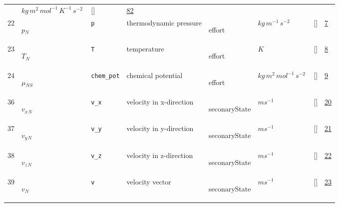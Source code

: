 \begin{longtable}{|p{1cm}|p{3cm}|p{3cm}|p{7cm}|p{3.0cm}|p{3cm}|p{2cm}|p{1cm}|}
             & $ kg \,m^{2} \,mol^{-1} \,K^{-1} \,s^{-2} \, $
             & []
             & \hyperlink{"e:82"}{ 82 }
                 \\
    22
             & \hypertarget{"v:22"}{ $ {p}{_{N}} $}
             & \verb|p|
             & thermodynamic pressure
             & \begin{lay}effort \end{lay}
             & $ kg \,m^{-1} \,s^{-2} \, $
             & []
             & \hyperlink{"e:7"}{ 7 }
                 \\
    23
             & \hypertarget{"v:23"}{ $ {T}{_{N}} $}
             & \verb|T|
             & temperature
             & \begin{lay}effort \end{lay}
             & $ K \, $
             & []
             & \hyperlink{"e:8"}{ 8 }
                 \\
    24
             & \hypertarget{"v:24"}{ $ {\mu}{_{{N S}}} $}
             & \verb|chem_pot|
             & chemical potential
             & \begin{lay}effort \end{lay}
             & $ kg \,m^{2} \,mol^{-1} \,s^{-2} \, $
             & []
             & \hyperlink{"e:9"}{ 9 }
                 \\
    36
             & \hypertarget{"v:36"}{ $ {v_x}{_{N}} $}
             & \verb|v_x|
             & velocity in x-direction
             & \begin{lay}seconaryState \end{lay}
             & $ m s^{-1} \, $
             & []
             & \hyperlink{"e:20"}{ 20 }
                 \\
    37
             & \hypertarget{"v:37"}{ $ {v_y}{_{N}} $}
             & \verb|v_y|
             & velocity in y-direction
             & \begin{lay}seconaryState \end{lay}
             & $ m s^{-1} \, $
             & []
             & \hyperlink{"e:21"}{ 21 }
                 \\
    38
             & \hypertarget{"v:38"}{ $ {v_z}{_{N}} $}
             & \verb|v_z|
             & velocity in z-direction
             & \begin{lay}seconaryState \end{lay}
             & $ m s^{-1} \, $
             & []
             & \hyperlink{"e:22"}{ 22 }
                 \\
    39
             & \hypertarget{"v:39"}{ $ {v}{_{N}} $}
             & \verb|v|
             & velocity vector
             & \begin{lay}seconaryState \end{lay}
             & $ m s^{-1} \, $
             & []
             & \hyperlink{"e:23"}{ 23 }
                 \\
    \end{longtable}